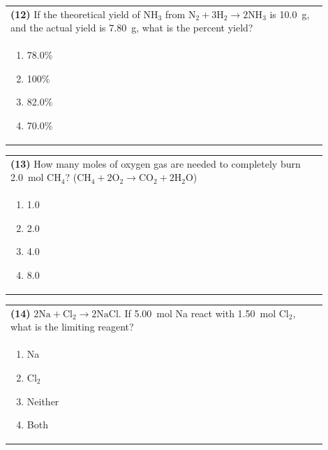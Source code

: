 \documentclass{article}
\begin{document}
\vspace{0.2cm}
\noindent\begin{tabular}{|p{0.9\linewidth}|}
\hline
\textbf{(12)} If the theoretical yield of NH$_3$ from $\text{N}_2 + 3\text{H}_2 \rightarrow 2\text{NH}_3$ is 10.0~g, and the actual yield is 7.80~g, what is the percent yield?\\[0.2cm]

\begin{minipage}[t]{0.85\linewidth}
\begin{enumerate}[label=\alph*.]
\item 78.0\%
\item 100\%
\item 82.0\%
\item 70.0\%
\end{enumerate}
\end{minipage}\\[0.2cm]
\hline
\end{tabular}

\newpage

\noindent\begin{tabular}{|p{0.9\linewidth}|}
\hline
\textbf{(13)} How many moles of oxygen gas are needed to completely burn 2.0~mol CH$_4$? ($\text{CH}_4 + 2\text{O}_2 \rightarrow \text{CO}_2 + 2\text{H}_2\text{O}$)\\[0.2cm]

\begin{minipage}[t]{0.85\linewidth}
\begin{enumerate}[label=\alph*.]
\item 1.0
\item 2.0
\item 4.0
\item 8.0
\end{enumerate}
\end{minipage}\\[0.2cm]
\hline
\end{tabular}

\vspace{0.2cm}
\noindent\begin{tabular}{|p{0.9\linewidth}|}
\hline
\textbf{(14)} $2\text{Na} + \text{Cl}_2 \rightarrow 2\text{NaCl}$. If 5.00~mol Na react with 1.50~mol Cl$_2$, what is the limiting reagent?\\[0.2cm]

\begin{minipage}[t]{0.85\linewidth}
\begin{enumerate}[label=\alph*.]
\item Na
\item Cl$_2$
\item Neither
\item Both
\end{enumerate}
\end{minipage}\\[0.2cm]
\hline
\end{tabular}
\end{document}
